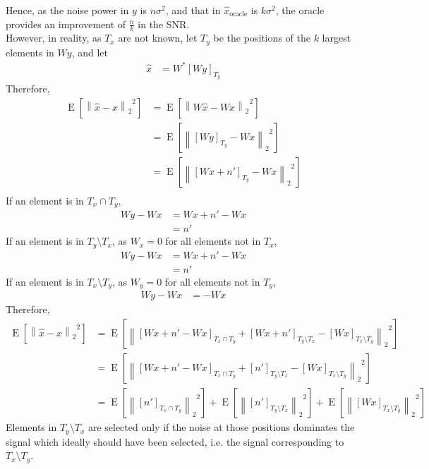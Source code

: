 \documentclass[titlepage, fleqn, a4paper, 12pt, twoside]{article}
\theoremstyle{definition}
\theoremstyle{theorem}
\DeclareMathOperator{\expct}{\mathrm{E}}
\begin{document}
Hence, as the noise power in $y$ is $n \sigma^2$, and that in $\hat{x}_{\text{oracle}}$ is $k \sigma^2$, the oracle provides an improvement of $\frac{n}{k}$ in the SNR.\\
However, in reality, as $T_x$ are not known, let $T_y$ be the positions of the $k$ largest elements in $W y$, and let
\begin{align*}
	\hat{x} &= W^* [W y]_{T_y}
\end{align*}
Therefore,
\begin{align*}
	\expct\left[ {\left\| \hat{x} - x \right\|_2}^2 \right] &= \expct\left[ {\left\| W \hat{x} - W x \right\|_2}^2 \right]\\
	&= \expct\left[ {\left\| [W y]_{T_y} - W x \right\|_2}^2 \right]\\
	&= \expct\left[ {\left\| [W x + n']_{T_y} - W x \right\|_2}^2 \right]\\
\end{align*}
If an element is in $T_x \cap T_y$,
\begin{align*}
	W y - W x &= W x + n' - W x\\
	&= n'
\end{align*}
If an element is in $T_y \setminus T_x$, as $W_x = 0$ for all elements not in $T_x$,
\begin{align*}
	W y - W x &= W x + n' - W x\\
	&= n'
\end{align*}
If an element is in $T_x \setminus T_y$, as $W_y = 0$ for all elements not in $T_y$,
\begin{align*}
	W y - W x &= -W x
\end{align*}
Therefore,
\begin{align*}
	\expct\left[ {\left\| \hat{x} - x \right\|_2}^2 \right] &= \expct\left[ {\left\| [W x + n' - W x]_{T_x \cap T_y} + [W x + n']_{T_y \setminus T_x} - [W x]_{T_x \setminus T_y} \right\|_2}^2 \right]\\
	&= \expct\left[ {\left\| [W x + n' - W x]_{T_x \cap T_y} + [n']_{T_y \setminus T_x} - [W x]_{T_x \setminus T_y} \right\|_2}^2 \right]\\
	&= \expct\left[ {\left\| [n']_{T_x \cap T_y} \right\|_2}^2 \right] + \expct\left[ {\left\| [n']_{T_y \setminus T_x} \right\|_2}^2 \right] + \expct\left[ {\left\| [W x]_{T_x \setminus T_y} \right\|_2}^2 \right]
\end{align*}
Elements in $T_y \setminus T_x$ are selected only if the noise at those positions dominates the signal which ideally should have been selected, i.e. the signal corresponding to $T_x \setminus T_y$.
\end{document}
